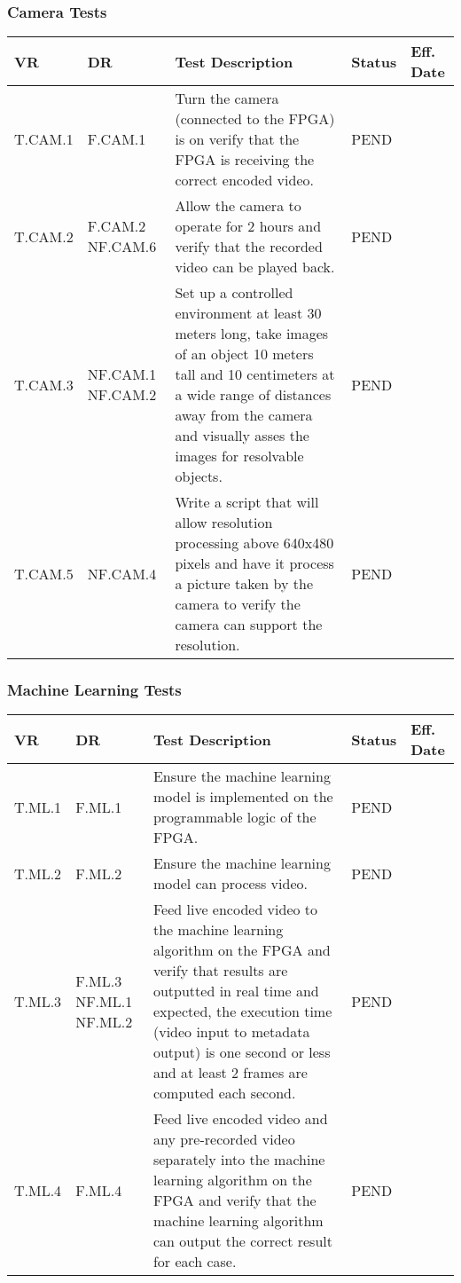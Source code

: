 \documentclass[10pt,letterpaper]{article}
\begin{document}
\subsubsection{Camera Tests}
\begin{table}[H]
	\begin{tabular}{ |p{1.2cm}|p{1.4cm}|p{9cm}|p{1.1cm}|p{1.7cm}|}
		\hline
		\textbf{VR}     & \textbf{DR}      & \textbf{Test Description}  	& \textbf{Status} & \textbf{Eff. Date} \\ \hline
		T.CAM.1 & F.CAM.1 	& Turn the camera (connected to the FPGA) is on verify that the FPGA is receiving the correct encoded video. & PEND & \\ \hline
		T.CAM.2 & F.CAM.2 NF.CAM.6 	& Allow the camera to operate for 2 hours and verify that the recorded video can be played back. & PEND & \\ \hline
		T.CAM.3 & NF.CAM.1 NF.CAM.2	& Set up a controlled environment at least 30 meters long, take images of an object 10 meters tall and 10 centimeters at a wide range of distances away from the camera and visually asses the images for resolvable objects. & PEND & \\ \hline
		T.CAM.5 & NF.CAM.4	& Write a script that will allow resolution processing above 640x480 pixels and have it process a picture taken by the camera to verify the camera can support the resolution. & PEND & \\ \hline
	\end{tabular}
\end{table}
\subsubsection{Machine Learning Tests}
\begin{table}[H]
	\begin{tabular}{ |p{1.1cm}|p{1.3cm}|p{9cm}|p{1.1cm}|p{1.7cm}|}
		\hline
		\textbf{VR}     & \textbf{DR}      & \textbf{Test Description}  	& \textbf{Status} & \textbf{Eff. Date} \\ \hline
		T.ML.1 & F.ML.1		& Ensure the machine learning model is implemented on the programmable logic of the FPGA. & PEND & \\ \hline %
		T.ML.2 & F.ML.2		& Ensure the machine learning model can process video. & PEND & \\ \hline %
		T.ML.3 & F.ML.3 NF.ML.1 NF.ML.2	& Feed live encoded video to the machine learning algorithm on the FPGA and verify that results are outputted in real time and expected, the execution time (video input to metadata output) is one second or less and at least 2 frames are computed each second. & PEND & \\ \hline
		T.ML.4 & F.ML.4		& Feed live encoded video and any pre-recorded video separately into the machine learning algorithm on the FPGA and verify that the machine learning algorithm can output the correct result for each case. & PEND & \\ \hline
	\end{tabular}
\end{table}
\end{document}
